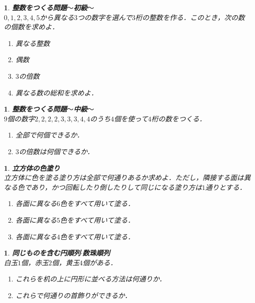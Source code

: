 \documentclass[10pt,
fleqn,
dvipdfmx,
uplatex
]{jsarticle}
\newtheorem{question}[Question]{}
\begin{document}
\begin{question}{\bf\boldmath 整数をつくる問題$〜$初級$〜$}\\
$0, 1, 2, 3, 4, 5$から異なる$3$つの数字を選んで$3$桁の整数を作る．このとき，次の数の個数を求めよ．
\begin{enumerate}
\item 異なる整数
\item 偶数
\item $3$の倍数
\item 異なる数の総和を求めよ．
\end{enumerate}

\end{question}



\begin{question}{\bf\boldmath 整数をつくる問題$〜$中級$〜$}\\
$9$個の数字$2, 2, 2, 2, 3, 3, 3, 4, 4$のうち$4$個を使って$4$桁の数をつくる．
\begin{enumerate}
\item 全部で何個できるか．
\item $3$の倍数は何個できるか．
\end{enumerate}

\end{question}



\begin{question}{\bf\boldmath 立方体の色塗り}\\
立方体に色を塗る塗り方は全部で何通りあるか求めよ．ただし，隣接する面は異なる色であり，かつ回転したり倒したりして同じになる塗り方は$1$通りとする．
\begin{enumerate}
\item 各面に異なる$6$色をすべて用いて塗る．
\item 各面に異なる$5$色をすべて用いて塗る．
\item 各面に異なる$4$色をすべて用いて塗る．
\end{enumerate}

\end{question}



\begin{question}{\bf\boldmath 同じものを含む円順列$\cdot$数珠順列}\\
白玉$1$個，赤玉$2$個，黄玉$4$個がある．
\begin{enumerate}
\item これらを机の上に円形に並べる方法は何通りか．
\item これらで何通りの首飾りができるか．
\end{enumerate}

\end{question}
\end{document}
